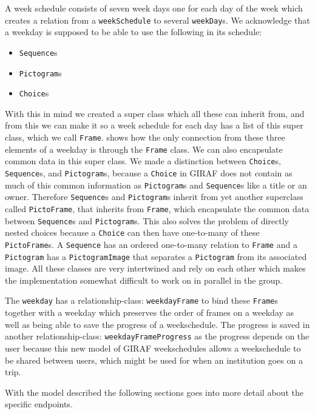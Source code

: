 A week schedule consists of seven week days one for each day of the week which creates a relation from a \texttt{weekSchedule} to several \texttt{weekDay}s.
We acknowledge that a weekday is supposed to be able to use the following in its schedule: 

\begin{itemize}
	\item \texttt{Sequence}s
	\item \texttt{Pictogram}s
	\item \texttt{Choice}s
\end{itemize}

With this in mind we created a super class which all these can inherit from, and from this we can make it so a week schedule for each day has a list of this super class, which we call \texttt{Frame}.
 shows how the only connection from these three elements of a weekday is through the \texttt{Frame} class.
We can also encapsulate common data in this super class.
We made a distinction between \texttt{Choice}s, \texttt{Sequence}s, and \texttt{Pictogram}s, because a \texttt{Choice} in GIRAF does not contain as much of this common information as \texttt{Pictogram}s and \texttt{Sequence}s like a title or an owner.
Therefore \texttt{Sequence}s and \texttt{Pictogram}s inherit from yet another superclass called \texttt{PictoFrame}, that inherits from \texttt{Frame}, which encapsulate the common data between \texttt{Sequence}s and \texttt{Pictogram}s.
This also solves the problem of directly nested choices because a \texttt{Choice} can then have one-to-many of these \texttt{PictoFrame}s.
A \texttt{Sequence} has an ordered one-to-many relation to \texttt{Frame} and a \texttt{Pictogram} has a \texttt{PictogramImage} that separates a \texttt{Pictogram} from its associated image.
All these classes are very intertwined and rely on each other which makes the implementation somewhat difficult to work on in parallel in the group.

The \texttt{weekday} has a relationship-class: \texttt{weekdayFrame} to bind these \texttt{Frame}s together with a weekday which preserves the order of frames on a weekday as well as being able to save the progress of a weekschedule.
The progress is saved in another relationship-class: \texttt{weekdayFrameProgress} as the progress depends on the user because this new model of GIRAF weekschedules allows a weekschedule to be shared between users, which might be used for when an institution goes on a trip.

With the model described the following sections goes into more detail about the specific endpoints.
